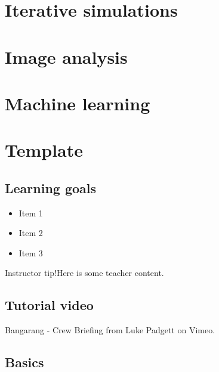 \documentclass[
]{book}
\providecommand{\tightlist}{%
  \setlength{\itemsep}{0pt}\setlength{\parskip}{0pt}}
\begin{document}
\hypertarget{iterative-simulations}{%
\chapter{Iterative simulations}\label{iterative-simulations}}

\hypertarget{image-analysis}{%
\chapter{Image analysis}\label{image-analysis}}

\hypertarget{machine-learning}{%
\chapter{Machine learning}\label{machine-learning}}

\hypertarget{template}{%
\chapter{Template}\label{template}}

\hypertarget{learning-goals-20}{%
\section*{Learning goals}\label{learning-goals-20}}

\begin{itemize}
\tightlist
\item
  Item 1\\
\item
  Item 2\\
\item
  Item 3
\end{itemize}

Instructor tip!Here is some teacher content.

\hypertarget{tutorial-video}{%
\section*{Tutorial video}\label{tutorial-video}}

Bangarang - Crew Briefing from Luke Padgett on Vimeo.

\hypertarget{basics-3}{%
\section*{Basics}\label{basics-3}}
\end{document}
